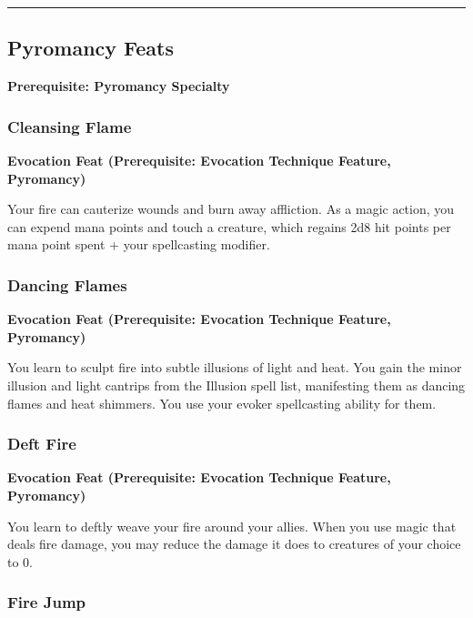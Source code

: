 \documentclass[12pt,letterpaper,twocolumn,openany,nodeprecatedcode,bg=none]{dndbook}
\begin{document}
\begin{center}\rule{0.5\linewidth}{0.5pt}\end{center}

\subsection{Pyromancy Feats}\label{pyromancy-feats}

\textbf{Prerequisite: Pyromancy Specialty}

\subsubsection{Cleansing Flame}\label{cleansing-flame}

\textbf{Evocation Feat (Prerequisite: Evocation Technique Feature,
Pyromancy)}

Your fire can cauterize wounds and burn away affliction. As a magic
action, you can expend mana points and touch a creature, which regains
2d8 hit points per mana point spent + your spellcasting modifier.

\subsubsection{Dancing Flames}\label{dancing-flames}

\textbf{Evocation Feat (Prerequisite: Evocation Technique Feature,
Pyromancy)}

You learn to sculpt fire into subtle illusions of light and heat. You
gain the minor illusion and light cantrips from the Illusion spell list,
manifesting them as dancing flames and heat shimmers. You use your
evoker spellcasting ability for them.

\subsubsection{Deft Fire}\label{deft-fire}

\textbf{Evocation Feat (Prerequisite: Evocation Technique Feature,
Pyromancy)}

You learn to deftly weave your fire around your allies. When you use
magic that deals fire damage, you may reduce the damage it does to
creatures of your choice to 0.

\subsubsection{Fire Jump}\label{fire-jump}
\end{document}
